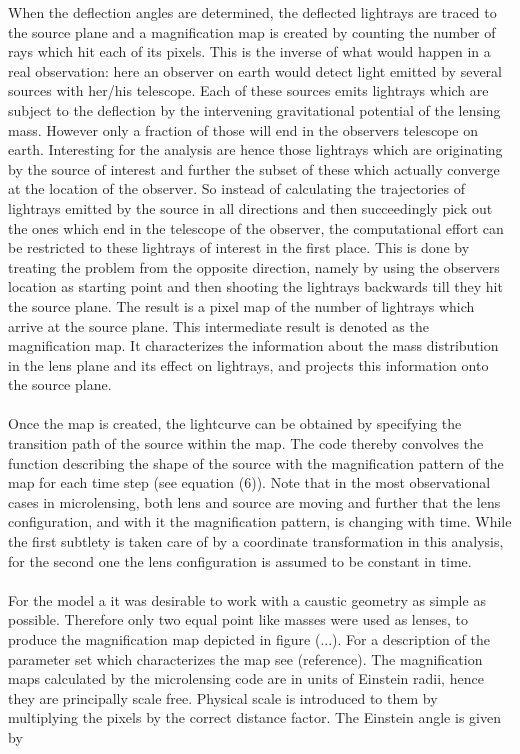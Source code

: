 When the deflection angles are determined, the deflected lightrays are traced to the source plane and a magnification map is created by counting the number of rays which hit each of its pixels. This is the inverse of what would happen in a real observation: here an observer on earth would detect light emitted by several sources with her/his telescope. Each of these sources emits lightrays which are subject to the deflection by the intervening gravitational potential of the lensing mass. However only a fraction of those will end in the observers telescope on earth. Interesting for the analysis are hence those lightrays which are originating by the source of interest and further the subset of these which actually converge at the location of the observer. So instead of calculating the trajectories of lightrays emitted by the source in all directions and then succeedingly pick out the ones which end in the telescope of the observer, the computational effort can be restricted to these lightrays of interest in the first place. This is done by treating the problem from the opposite direction, namely by using the observers location as starting point and then shooting the lightrays backwards till they hit the source plane. The result is a pixel map of the number of lightrays which arrive at the source plane. This intermediate result is denoted as the magnification map. It characterizes the information about the mass distribution in the lens plane and its effect on lightrays, and projects this information onto the source plane. \\\\
Once the map is created, the lightcurve can be obtained by specifying the transition path of the source within the map. The code thereby convolves the function describing the shape of the source with the magnification pattern of the map for each time step (see equation (6)). Note that in the most observational cases in microlensing, both lens and source are moving and further that the lens configuration, and with it the magnification pattern, is changing with time. While the first subtlety is taken care of by a coordinate transformation in this analysis, for the second one the lens configuration is assumed to be constant in time.  \\\\
For the model a it was desirable to work with a caustic geometry as simple as possible. Therefore only two equal point like masses were used as lenses, to produce the magnification map depicted in figure (...). For a description of the parameter set which characterizes the map see (reference). The magnification maps calculated by the microlensing code are in units of Einstein radii, hence they are principally scale free. Physical scale is introduced to them by multiplying the pixels by the correct distance factor. The Einstein angle is given by   
